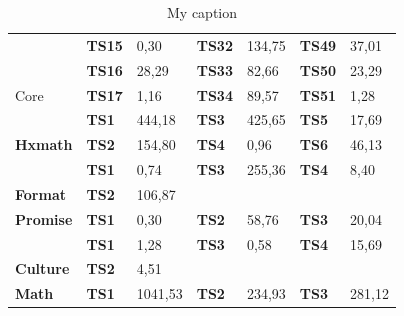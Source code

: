 \begin{table}[]
{\begin{tabular}{|l|l|l|l|l|l|l|}
		& \textbf{TS15}      & 0,30                            & \textbf{TS32}      & 134,75                         & \textbf{TS49}      & 37,01                          \\ \cline{2-7} 
		& \textbf{TS16}      & 28,29                           & \textbf{TS33}      & 82,66                          & \textbf{TS50}      & 23,29                          \\ \cline{2-7} 
		\multirow{-17}{*}{Core}            & \textbf{TS17}      & 1,16                            & \textbf{TS34}      & 89,57                          & \textbf{TS51}      & 1,28                           \\ \hline
		& \textbf{TS1}       & \cellcolor[HTML]{C0C0C0}444,18  & \textbf{TS3}       & \cellcolor[HTML]{C0C0C0}425,65 & \textbf{TS5}       & 17,69                          \\ \cline{2-7} 
		\multirow{-2}{*}{\textbf{Hxmath}}  & \textbf{TS2}       & 154,80                          & \textbf{TS4}       & 0,96                           & \textbf{TS6}       & 46,13                          \\ \hline
		& \textbf{TS1}       & 0,74                            & \textbf{TS3}       & 255,36                         & \textbf{TS4}       & 8,40                           \\ \cline{2-7} 
		\multirow{-2}{*}{\textbf{Format}}  & \textbf{TS2}       & 106,87                          & \multicolumn{4}{l|}{\textbf{}}                                                                            \\ \hline
		\textbf{Promise}                   & \textbf{TS1}       & 0,30                            & \textbf{TS2}       & 58,76                          & \textbf{TS3}       & 20,04                          \\ \hline
		& \textbf{TS1}       & 1,28                            & \textbf{TS3}       & 0,58                           & \textbf{TS4}       & 15,69                          \\ \cline{2-7} 
		\multirow{-2}{*}{\textbf{Culture}} & \textbf{TS2}       & 4,51                            & \multicolumn{4}{l|}{}                                                                                     \\ \hline
		\textbf{Math}                      & \textbf{TS1}       & \cellcolor[HTML]{C0C0C0}1041,53 & \textbf{TS2}       & 234,93                         & \textbf{TS3}       & 281,12                         \\ \hline
	\end{tabular}%
}
	\caption{My caption}
	\label{my-label}
\end{table}


